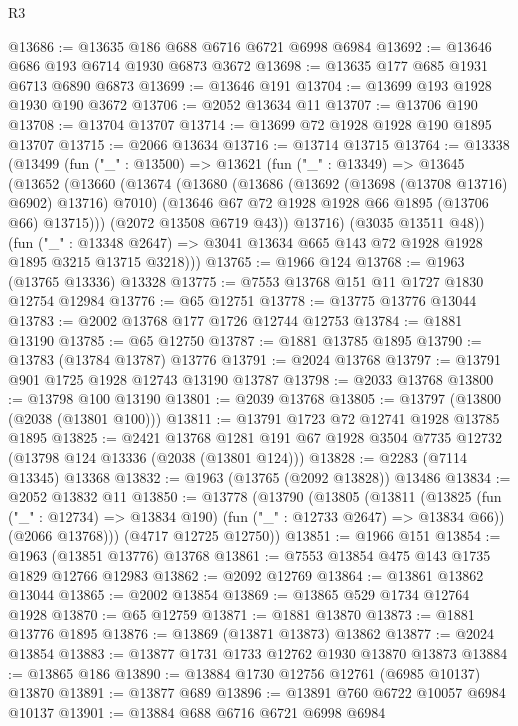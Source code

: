 \begin{lexlean}{R3}
\begin{coremodule}
@13686 := @13635 @186 @688 @6716 @6721 @6998 @6984
@13692 := @13646 @686 @193 @6714 @1930 @6873 @3672
@13698 := @13635 @177 @685 @1931 @6713 @6890 @6873
@13699 := @13646 @191
@13704 := @13699 @193 @1928 @1930 @190 @3672
@13706 := @2052 @13634 @11
@13707 := @13706 @190
@13708 := @13704 @13707
@13714 := @13699 @72 @1928 @1928 @190 @1895 @13707
@13715 := @2066 @13634
@13716 := @13714 @13715
@13764 := @13338
    (@13499
      (fun ("_" : @13500) =>
      @13621
        (fun ("_" : @13349) =>
        @13645
          (@13652
            (@13660
              (@13674
                (@13680
                  (@13686 (@13692 (@13698 (@13708 @13716) @6902) @13716) @7010)
                  (@13646 @67 @72 @1928 @1928 @66 @1895 (@13706 @66) @13715)))
              (@2072 @13508 @6719 @43))
            @13716)
          (@3035 @13511 @48))
        (fun ("_" : @13348 @2647) =>
        @3041 @13634 @665 @143 @72 @1928 @1928 @1895 @3215 @13715 @3218)))
@13765 := @1966 @124
@13768 := @1963 (@13765 @13336) @13328
@13775 := @7553 @13768 @151 @11 @1727 @1830 @12754 @12984
@13776 := @65 @12751
@13778 := @13775 @13776 @13044
@13783 := @2002 @13768 @177 @1726 @12744 @12753
@13784 := @1881 @13190
@13785 := @65 @12750
@13787 := @1881 @13785 @1895
@13790 := @13783 (@13784 @13787) @13776
@13791 := @2024 @13768
@13797 := @13791 @901 @1725 @1928 @12743 @13190 @13787
@13798 := @2033 @13768
@13800 := @13798 @100 @13190
@13801 := @2039 @13768
@13805 := @13797 (@13800 (@2038 (@13801 @100)))
@13811 := @13791 @1723 @72 @12741 @1928 @13785 @1895
@13825 := @2421
    @13768
    @1281
    @191
    @67
    @1928
    @3504
    @7735
    @12732
    (@13798 @124 @13336 (@2038 (@13801 @124)))
@13828 := @2283 (@7114 @13345) @13368
@13832 := @1963 (@13765 (@2092 @13828)) @13486
@13834 := @2052 @13832 @11
@13850 := @13778
    (@13790
      (@13805
        (@13811
          (@13825 (fun ("_" : @12734) => @13834 @190) (fun ("_" : @12733 @2647) => @13834 @66))
          (@2066 @13768)))
      (@4717 @12725 @12750))
@13851 := @1966 @151
@13854 := @1963 (@13851 @13776) @13768
@13861 := @7553 @13854 @475 @143 @1735 @1829 @12766 @12983
@13862 := @2092 @12769
@13864 := @13861 @13862 @13044
@13865 := @2002 @13854
@13869 := @13865 @529 @1734 @12764 @1928
@13870 := @65 @12759
@13871 := @1881 @13870
@13873 := @1881 @13776 @1895
@13876 := @13869 (@13871 @13873) @13862
@13877 := @2024 @13854
@13883 := @13877 @1731 @1733 @12762 @1930 @13870 @13873
@13884 := @13865 @186
@13890 := @13884 @1730 @12756 @12761 (@6985 @10137) @13870
@13891 := @13877 @689
@13896 := @13891 @760 @6722 @10057 @6984 @10137
@13901 := @13884 @688 @6716 @6721 @6998 @6984

\end{coremodule}
\end{lexlean}
